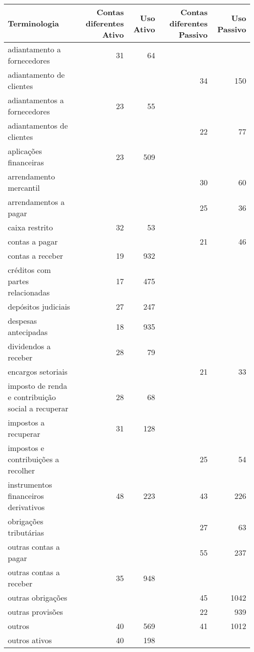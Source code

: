 \begin{table}[ht]
\centering
\begin{tabular}{lrrrr}
  \hline
Terminologia & Contas diferentes Ativo & Uso Ativo & Contas diferentes Passivo & Uso Passivo \\ 
  \hline
adiantamento a fornecedores &  31 &  64 &  &  \\ 
  adiantamento de clientes &  &  &  34 & 150 \\ 
  adiantamentos a fornecedores &  23 &  55 &  &  \\ 
  adiantamentos de clientes &  &  &  22 &  77 \\ 
  aplicações financeiras &  23 & 509 &  &  \\ 
  arrendamento mercantil &  &  &  30 &  60 \\ 
  arrendamentos a pagar &  &  &  25 &  36 \\ 
  caixa restrito &  32 &  53 &  &  \\ 
  contas a pagar &  &  &  21 &  46 \\ 
  contas a receber &  19 & 932 &  &  \\ 
  créditos com partes relacionadas &  17 & 475 &  &  \\ 
  depósitos judiciais &  27 & 247 &  &  \\ 
  despesas antecipadas &  18 & 935 &  &  \\ 
  dividendos a receber &  28 &  79 &  &  \\ 
  encargos setoriais &  &  &  21 &  33 \\ 
  imposto de renda e contribuição social a recuperar &  28 &  68 &  &  \\ 
  impostos a recuperar &  31 & 128 &  &  \\ 
  impostos e contribuições a recolher &  &  &  25 &  54 \\ 
  instrumentos financeiros derivativos &  48 & 223 &  43 & 226 \\ 
  obrigações tributárias &  &  &  27 &  63 \\ 
  outras contas a pagar &  &  &  55 & 237 \\ 
  outras contas a receber &  35 & 948 &  &  \\ 
  outras obrigações &  &  &  45 & 1042 \\ 
  outras provisões &  &  &  22 & 939 \\ 
  outros &  40 & 569 &  41 & 1012 \\ 
  outros ativos &  40 & 198 &  &  \\ 

\end{tabular}
\end{table}
